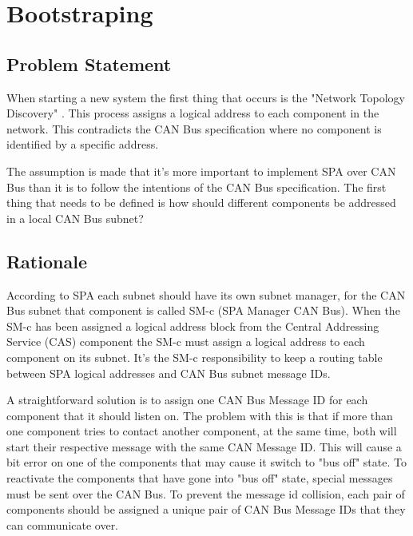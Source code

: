 \section{Bootstraping} \label{appendix:bootstraping}
\subsection{Problem Statement}
When starting a new system the first thing that occurs is the "Network Topology
Discovery" \cite{standard:spa_networking}. This process assigns a logical
address to each component in the network. This contradicts the CAN Bus
specification where no component is identified by a specific address.

The assumption is made that it's more important to implement SPA over CAN Bus
than it is to follow the intentions of the CAN Bus specification. The first
thing that needs to be defined is how should different components be addressed
in a local CAN Bus subnet?

\subsection{Rationale}
According to SPA each subnet should have its own subnet manager, for the CAN Bus
subnet that component is called SM-c (SPA Manager CAN Bus). When the SM-c has
been assigned a logical address block from the Central Addressing Service (CAS)
component the SM-c must assign a logical address to each component on its
subnet. It's the SM-c responsibility to keep a routing table between SPA
logical addresses and CAN Bus subnet message IDs.

A straightforward solution is to assign one CAN Bus Message ID for each
component that it should listen on. The problem with this is that if more than
one component tries to contact another component, at the same time, both will
start their respective message with the same CAN Message ID. This will cause
a bit error on one of the components that may cause it switch to "bus off" state. To
reactivate the components that have gone into "bus off" state, special messages
must be sent over the CAN Bus. To prevent the message id collision, each pair
of components should be assigned a unique pair of CAN Bus Message IDs that they
can communicate over.


